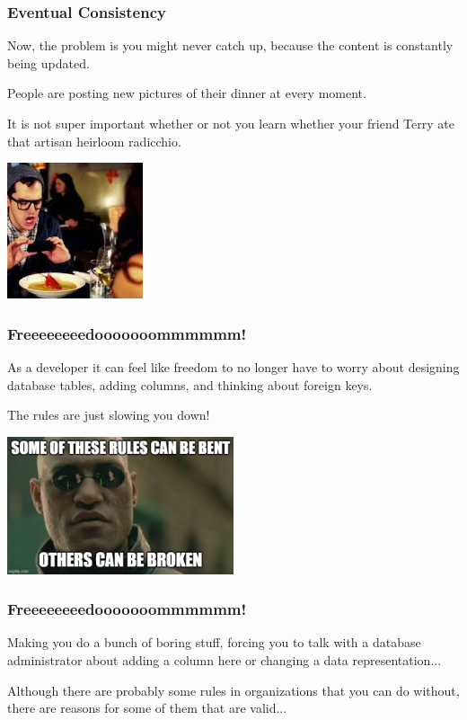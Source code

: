 \begin{frame}
\frametitle{Eventual Consistency}


Now, the problem is you might never catch up, because the content is constantly being updated. 

People are posting new pictures of their dinner at every moment. 

It is not super important whether or not you learn whether your friend Terry ate that artisan heirloom radicchio.

\begin{center}
	\includegraphics[width=0.3\textwidth]{images/eidti.jpg}
\end{center}

\end{frame}



\begin{frame}
\frametitle{Freeeeeeeedooooooommmmmm!}

As a developer it can feel like freedom to no longer have to worry about designing database tables, adding columns, and thinking about foreign keys. 

The rules are just slowing you down! 

\begin{center}
	\includegraphics[width=0.5\textwidth]{images/breakrules.jpg}
\end{center}

\end{frame}



\begin{frame}
\frametitle{Freeeeeeeedooooooommmmmm!}

Making you do a bunch of boring stuff, forcing you to talk with a database administrator about adding a column here or changing a data representation... 

Although there are probably some rules in organizations that you can do without, there are reasons for some of them that are valid...

\end{frame}



